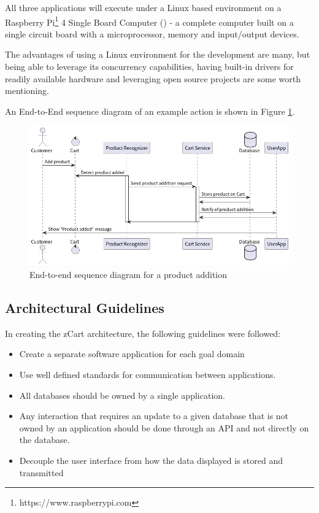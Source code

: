 \documentclass[openright]{normas-utf-tex} %
\begin{document}
All three applications will execute under a Linux \cite{Tanenbaum2015} 
based environment on a Raspberry Pi\footnote{https://www.raspberrypi.com} 4 Single Board
Computer () - a complete computer built on a single 
circuit board with a microprocessor, memory and input/output devices.

The advantages of using a Linux environment for the development are many, but
being able to leverage its concurrency capabilities, having built-in drivers
for readily available hardware and leveraging open source projects are some 
worth mentioning.

An End-to-End sequence diagram of an example action is shown in Figure \ref{fig:e2eseq}.

\begin{figure}[H]
	\centering
	\includegraphics[width=1\textwidth]{./images/E2E.png}
	\caption[End-to-end sequence diagram for a product addition]{End-to-end sequence diagram for a product addition}
	\label{fig:e2eseq}
\end{figure}

\subsection{Architectural Guidelines}
In creating the zCart architecture, the following guidelines were followed:

\begin{itemize}
    \item Create a separate software application for each goal domain
    \item Use well defined standards for communication between applications.
    \item All databases should be owned by a single application. 
    \item Any interaction that requires an update to a given database that is
        not owned by an application should be done through an API and not
        directly on the database.
    \item Decouple the user interface from how the data displayed is stored and transmitted
\end{itemize}
\end{document}
